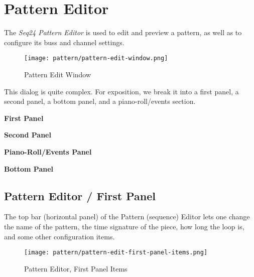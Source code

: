 %
%

\section{Pattern Editor}
\label{sec:seq24_pattern_editor}

   The \textsl{Seq24 Pattern Editor} is used to edit and preview a pattern,
   as well as to configure its buss and channel settings.

\begin{figure}[H]
   \centering 
   \texttt{[image: pattern/pattern-edit-window.png]}
   \caption{Pattern Edit Window}
   \label{fig:pattern_edit_window}
\end{figure}

   This dialog is quite complex.
   For exposition, we break it into a first panel, a second panel, a
   bottom panel, and a piano-roll/events section.

   \begin{enumber}
      \item \textbf{First Panel}
      \item \textbf{Second Panel}
      \item \textbf{Piano-Roll/Events Panel}
      \item \textbf{Bottom Panel}
   \end{enumber}

\subsection{Pattern Editor / First Panel}
\label{subsec:seq24_pattern_editor_first}

   The top bar (horizontal panel) of the Pattern (sequence) Editor
   lets one change the name of
   the pattern, the time signature of the piece, how long the loop is, and
   some other configuration items.

\begin{figure}[H]
   \centering 
   \texttt{[image: pattern/pattern-edit-first-panel-items.png]}
   \caption{Pattern Editor, First Panel Items}
   \label{fig:pattern_editor_first_panel_items}
\end{figure}

